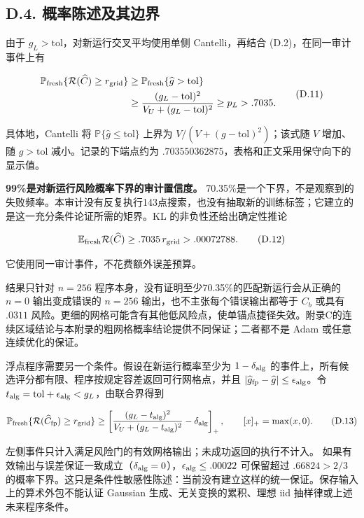 \documentclass[11pt,a4paper]{article}
\begin{document}
\subsection*{D.4.
概率陈述及其边界}\label{d.4.-ux6982ux7387ux9648ux8ff0ux53caux5176ux8fb9ux754c}

由于 \(g_L>\mathrm{tol}\)，对新运行交叉平均使用单侧 Cantelli，再结合
(D.2)，在同一审计事件上有

\[
\begin{aligned}
\mathbb P_{\rm fresh}\{\mathcal R(\widehat C)\ge r_{\rm grid}\}
&\ge\mathbb P_{\rm fresh}\{\widehat g>\mathrm{tol}\}\\
&\ge\frac{(g_L-\mathrm{tol})^2}{V_U+(g_L-\mathrm{tol})^2}
\ge p_L>.7035.
\end{aligned}
\tag{D.11}
\]

具体地，Cantelli 将 \(\mathbb P\{\widehat g\le\mathrm{tol}\}\) 上界为
\(V/(V+(g-\mathrm{tol})^2)\)；该式随 \(V\) 增加、随 \(g>\mathrm{tol}\)
减小。记录的下端点约为
\(.703550362875\)，表格和正文采用保守向下的显示值。

\textbf{99\%是对新运行风险概率下界的审计置信度。}
70.35\%是一个下界，不是观察到的失败频率。本审计没有反复执行143点搜索，也没有抽取新的训练标签；它建立的是这一充分条件论证所需的矩界。KL
的非负性还给出确定性推论

\[
\mathbb E_{\rm fresh}\mathcal R(\widehat C)
\ge .7035\,r_{\rm grid}>.00072788.
\tag{D.12}
\]

它使用同一审计事件，不花费额外误差预算。

结果只针对 \(n=256\) 程序本身，没有证明至少70.35\%的匹配新运行会从正确的
\(n=0\) 输出变成错误的 \(n=256\) 输出，也不主张每个错误输出都等于
\(C_b\) 或具有 \(.0311\)
风险。更细的网格可能含有其他低风险点，使单锚点捷径失效。附录C的连续区域结论与本附录的粗网格概率结论提供不同保证；二者都不是
Adam 或任意连续优化的保证。

浮点程序需要另一个条件。假设在新运行概率至少为 \(1-\delta_{\rm alg}\)
的事件上，所有候选评分都有限、程序按规定容差返回可行网格点，并且
\(|\widehat g_{\rm fp}-\widehat g|\le\epsilon_{\rm alg}\)。令
\(t_{\rm alg}=\mathrm{tol}+\epsilon_{\rm alg}<g_L\)，由联合界得到

\[
\mathbb P_{\rm fresh}\{\mathcal R(\widehat C_{\rm fp})\ge r_{\rm grid}\}
\ge\left[
\frac{(g_L-t_{\rm alg})^2}{V_U+(g_L-t_{\rm alg})^2}
-\delta_{\rm alg}\right]_+,\qquad [x]_+=\max(x,0).
\tag{D.13}
\]

左侧事件只计入满足风险门的有效网格输出；未成功返回的执行不计入。
如果有效输出与误差保证一致成立（\(\delta_{\rm alg}=0\)），\(\epsilon_{\rm alg}\le.00022\)
可保留超过 \(.66824>2/3\)
的概率下界。这只是条件性敏感性陈述：当前没有建立这样的统一保证。保存输入上的算术外包不能认证
Gaussian 生成、无关变换的累积、理想 iid 抽样律或上述未来程序条件。
\end{document}
